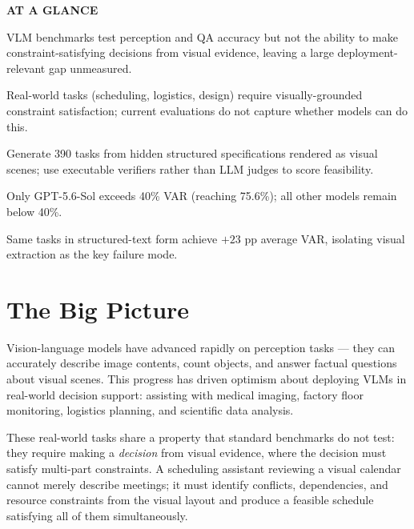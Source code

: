\documentclass[10pt,twocolumn]{article}
\begin{document}
\begin{mdframed}[backgroundcolor=boxgray,linecolor=rulered,linewidth=1pt,
    innerleftmargin=6pt,innerrightmargin=6pt,
    innertopmargin=6pt,innerbottommargin=6pt]
\textbf{\small AT A GLANCE}\par\vspace{4pt}
\begin{description}[leftmargin=0pt,labelsep=4pt,itemsep=2pt,parsep=0pt,
    font=\small\bfseries]
  \item[Problem:] VLM benchmarks test perception and QA accuracy but
    not the ability to make constraint-satisfying decisions from visual
    evidence, leaving a large deployment-relevant gap unmeasured.
  \item[Why it matters:] Real-world tasks (scheduling, logistics,
    design) require visually-grounded constraint satisfaction; current
    evaluations do not capture whether models can do this.
  \item[Method:] Generate 390 tasks from hidden structured
    specifications rendered as visual scenes; use executable verifiers
    rather than LLM judges to score feasibility.
  \item[Result:] Only GPT-5.6-Sol exceeds 40\% VAR (reaching 75.6\%);
    all other models remain below 40\%.
  \item[Evidence:] Same tasks in structured-text form achieve $+23$ pp
    average VAR, isolating visual extraction as the key failure mode.
\end{description}
\end{mdframed}

\section{The Big Picture}

Vision-language models have advanced rapidly on perception tasks ---
they can accurately describe image contents, count objects, and answer
factual questions about visual scenes. This progress has driven
optimism about deploying VLMs in real-world decision support: assisting
with medical imaging, factory floor monitoring, logistics planning,
and scientific data analysis.

These real-world tasks share a property that standard benchmarks do
not test: they require making a \emph{decision} from visual evidence,
where the decision must satisfy multi-part constraints. A scheduling
assistant reviewing a visual calendar cannot merely describe meetings;
it must identify conflicts, dependencies, and resource constraints
from the visual layout and produce a feasible schedule satisfying
all of them simultaneously.
\end{document}
